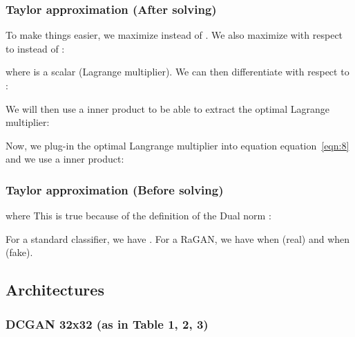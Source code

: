 \documentclass{article}
\def\eqref#1{equation~\ref{#1}}
\begin{document}
\subsubsection{Taylor approximation (After solving)}

To make things easier, we maximize  instead of . We also maximize with respect to  instead of :


where  is a scalar (Lagrange multiplier).
We can then differentiate with respect to :

We will then use a inner product to be able to extract the optimal Lagrange multiplier:

Now, we plug-in the optimal Langrange multiplier into equation \eqref{eqn:8} and we use a inner product:


\subsubsection{Taylor approximation (Before solving)}


where 
This is true because of the definition of the Dual norm \citep{rudin1991functional}:


For a standard classifier, we have . For a RaGAN, we have  when  (real) and  when  (fake).

\subsection{Architectures}

\subsubsection{DCGAN 32x32 (as in Table 1, 2, 3)}
\end{document}
